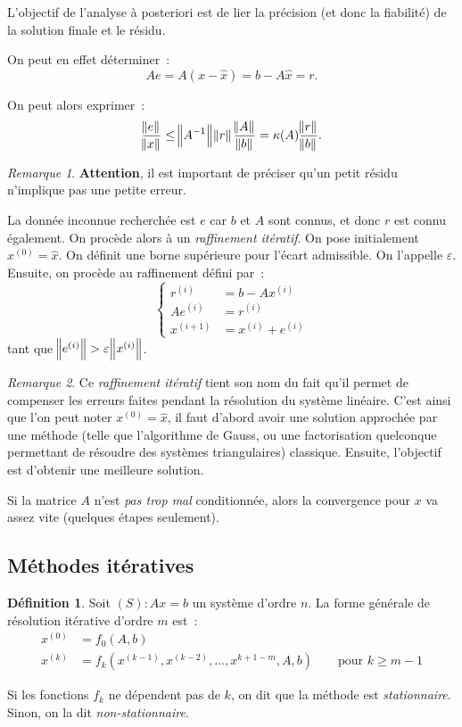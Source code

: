 \documentclass{article}
\theoremstyle{definition}
\newtheorem{déf}[thm]{Définition}
\theoremstyle{remark}
\newtheorem*{rmq}{Remarque}
\begin{document}
		L'objectif de l'analyse à posteriori est de lier la précision (et donc la fiabilité) de la solution finale et le résidu.

		On peut en effet déterminer~:
		\[Ae = A(x-\widehat x) = b - A\widehat x = r.\]

		On peut alors exprimer~:
		\[\frac {\norm e}{\norm x} \leq \norm{A^{-1}}\norm r\frac {\norm A}{\norm b} = \kappa(A)\frac {\norm r}{\norm b}.\]

		\begin{rmq} \textbf{Attention}, il est important de préciser qu'un petit résidu n'implique pas une petite erreur. \end{rmq}

		La donnée inconnue recherchée est $e$ car $b$ et $A$ sont connus, et donc $r$ est connu également. On procède alors à un \emph{raffinement itératif}.
		On pose initialement $x^{(0)} = \widehat x$. On définit une borne supérieure pour l'écart admissible. On l'appelle $\varepsilon$. Ensuite, on procède
		au raffinement défini par~:
		\[\begin{cases}
			r^{(i)} &= b - Ax^{(i)} \\
			Ae^{(i)} &= r^{(i)} \\
			x^{(i+1)} &= x^{(i)} + e^{(i)}
		\end{cases}\]
		tant que $\norm{e^{(i)}} > \varepsilon\norm{x^{(i)}}$.

		\begin{rmq} Ce \emph{raffinement itératif} tient son nom du fait qu'il permet de compenser les erreurs faites pendant la résolution du système linéaire.
		C'est ainsi que l'on peut noter $x^{(0)} = \widehat x$, il faut d'abord avoir une solution approchée par une méthode (telle que l'algorithme de Gauss,
		ou une factorisation quelconque permettant de résoudre des systèmes triangulaires) classique. Ensuite, l'objectif est d'obtenir une meilleure solution.

		Si la matrice $A$ n'est \emph{pas trop mal} conditionnée, alors la convergence pour $x$ va assez vite (quelques étapes seulement).
		\end{rmq}

	\subsection{Méthodes itératives}
		\begin{déf} Soit $(S) : Ax = b$ un système d'ordre $n$. La forme générale de résolution itérative d'ordre $m$ est~:
		\begin{align*}
			x^{(0)} &= f_0(A, b) \\
			x^{(k)} &= f_k(x^{(k-1)}, x^{(k-2)}, \dotsc, x^{k+1-m}, A, b)\qquad\text{pour }k \geq m-1
		\end{align*}

		Si les fonctions $f_k$ ne dépendent pas de $k$, on dit que la méthode est \emph{stationnaire}. Sinon, on la dit \emph{non-stationnaire}.
		\end{déf}
\end{document}
